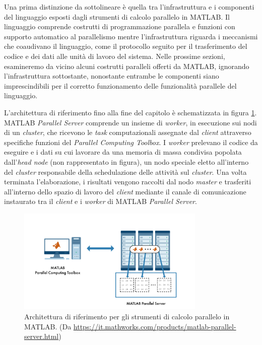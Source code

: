 Una prima distinzione da sottolineare \`e quella tra l'infrastruttura e i componenti del linguaggio esposti dagli strumenti di calcolo parallelo in MATLAB. 
Il linguaggio comprende costrutti di programmazione parallela e funzioni con supporto automatico al parallelismo mentre l'infrastruttura riguarda i meccanismi 
che coaudivano il linguaggio, come il protocollo seguito per il trasferimento del codice e dei dati alle unit\`a di lavoro del sistema. \newline
Nelle prossime sezioni, esamineremo da vicino alcuni costrutti paralleli offerti da MATLAB, ignorando l'infrastruttura sottostante, nonostante entrambe le componenti 
siano imprescindibili per il corretto funzionamento delle funzionalit\`a parallele del linguaggio.

L'architettura di riferimento fino alla fine del capitolo \`e schematizzata in figura \ref{fig:ArchitetturaRiferimento}.\newline
MATLAB \textit{Parallel Server} comprende un insieme di \textit{worker}, in esecuzione sui nodi di un \textit{cluster}, che ricevono le 
\textit{task} computazionali assegnate dal \textit{client} attraverso specifiche funzioni del \textit{Parallel Computing Toolbox}. \newline
I \textit{worker} prelevano il codice da eseguire e i dati su cui lavorare da una memoria di massa condivisa popolata dall'\textit{head node} 
(non rappresentato in figura), un nodo speciale eletto all'interno del \textit{cluster} responsabile della schedulazione delle attivit\`a sul \textit{cluster}.\newline
Una volta terminata l'elaborazione, i risultati vengono raccolti dal nodo \textit{master} e trasferiti all'interno dello spazio di lavoro del \textit{client} 
mediante il canale di comunicazione instaurato tra il \textit{client} e i \textit{worker} di MATLAB \textit{Parallel Server}.

\begin{figure}[htbp]
    \centering
    \includegraphics[width=0.8\textwidth]{../Immagini/Capitolo 2/ReferenceArchitecture.png}
    \caption{Architettura di riferimento per gli strumenti di calcolo parallelo in MATLAB. 
    \small{(Da \url{https://it.mathworks.com/products/matlab-parallel-server.html})}}
    \label{fig:ArchitetturaRiferimento}
\end{figure}

